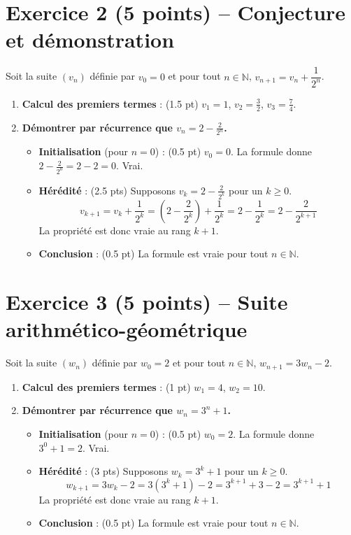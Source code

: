 \documentclass[14pt, a4paper]{extarticle}
\newcommand{\N}{\mathbb{N}}
\begin{document}
\section*{Exercice 2 (5 points) -- Conjecture et démonstration}
Soit la suite $(v_n)$ définie par $v_0 = 0$ et pour tout $n \in \N$, $v_{n+1} = v_n + \dfrac{1}{2^n}$.

\begin{enumerate}
    \item \textbf{Calcul des premiers termes} : (1.5 pt)
    $v_1 = 1$, $v_2 = \frac{3}{2}$, $v_3 = \frac{7}{4}$.

    \item \textbf{Démontrer par récurrence que $v_n = 2 - \frac{2}{2^n}$.}
    \begin{itemize}
        \item \textbf{Initialisation} (pour $n=0$) : (0.5 pt)
        $v_0 = 0$. La formule donne $2 - \frac{2}{2^0} = 2 - 2 = 0$. Vrai.
        \item \textbf{Hérédité} : (2.5 pts)
        Supposons $v_k = 2 - \frac{2}{2^k}$ pour un $k \ge 0$.
        \[ v_{k+1} = v_k + \frac{1}{2^k} = \left(2 - \frac{2}{2^k}\right) + \frac{1}{2^k} = 2 - \frac{1}{2^k} = 2 - \frac{2}{2^{k+1}} \]
        La propriété est donc vraie au rang $k+1$.
        \item \textbf{Conclusion} : (0.5 pt)
        La formule est vraie pour tout $n \in \N$.
    \end{itemize}
\end{enumerate}

\section*{Exercice 3 (5 points) -- Suite arithmético-géométrique}
Soit la suite $(w_n)$ définie par $w_0 = 2$ et pour tout $n \in \N$, $w_{n+1} = 3w_n - 2$.

\begin{enumerate}
    \item \textbf{Calcul des premiers termes} : (1 pt)
    $w_1 = 4$, $w_2 = 10$.

    \item \textbf{Démontrer par récurrence que $w_n = 3^n + 1$.}
    \begin{itemize}
        \item \textbf{Initialisation} (pour $n=0$) : (0.5 pt)
        $w_0 = 2$. La formule donne $3^0 + 1 = 2$. Vrai.
        \item \textbf{Hérédité} : (3 pts)
        Supposons $w_k = 3^k + 1$ pour un $k \ge 0$.
        \[ w_{k+1} = 3w_k - 2 = 3(3^k + 1) - 2 = 3^{k+1} + 3 - 2 = 3^{k+1} + 1 \]
        La propriété est donc vraie au rang $k+1$.
        \item \textbf{Conclusion} : (0.5 pt)
        La formule est vraie pour tout $n \in \N$.
    \end{itemize}
\end{enumerate}
\end{document}
